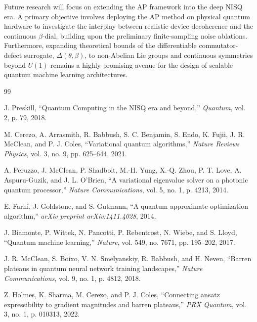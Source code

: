 \documentclass[10pt,twocolumn]{article}
\theoremstyle{remark}
\begin{document}
Future research will focus on extending the AP framework into the deep NISQ era. A primary objective involves deploying the AP method on physical quantum hardware to investigate the interplay between realistic device decoherence and the continuous $\beta$-dial, building upon the preliminary finite-sampling noise ablations. Furthermore, expanding theoretical bounds of the differentiable commutator-defect surrogate, $\Delta(\theta, \beta)$, to non-Abelian Lie groups and continuous symmetries beyond $U(1)$ remains a highly promising avenue for the design of scalable quantum machine learning architectures.


\renewcommand{\refname}{References}
\begin{thebibliography}{99}

J. Preskill, ``Quantum Computing in the NISQ era and beyond,'' \textit{Quantum}, vol. 2, p. 79, 2018.

M. Cerezo, A. Arrasmith, R. Babbush, S. C. Benjamin, S. Endo, K. Fujii, J. R. McClean, and P. J. Coles, ``Variational quantum algorithms,'' \textit{Nature Reviews Physics}, vol. 3, no. 9, pp. 625--644, 2021.

A. Peruzzo, J. McClean, P. Shadbolt, M.-H. Yung, X.-Q. Zhou, P. T. Love, A. Aspuru-Guzik, and J. L. O'Brien, ``A variational eigenvalue solver on a photonic quantum processor,'' \textit{Nature Communications}, vol. 5, no. 1, p. 4213, 2014.

E. Farhi, J. Goldstone, and S. Gutmann, ``A quantum approximate optimization algorithm,'' \textit{arXiv preprint arXiv:1411.4028}, 2014.

J. Biamonte, P. Wittek, N. Pancotti, P. Rebentrost, N. Wiebe, and S. Lloyd, ``Quantum machine learning,'' \textit{Nature}, vol. 549, no. 7671, pp. 195--202, 2017.

J. R. McClean, S. Boixo, V. N. Smelyanskiy, R. Babbush, and H. Neven, ``Barren plateaus in quantum neural network training landscapes,'' \textit{Nature Communications}, vol. 9, no. 1, p. 4812, 2018.

Z. Holmes, K. Sharma, M. Cerezo, and P. J. Coles, ``Connecting ansatz expressibility to gradient magnitudes and barren plateaus,'' \textit{PRX Quantum}, vol. 3, no. 1, p. 010313, 2022.


\end{thebibliography}
\end{document}
